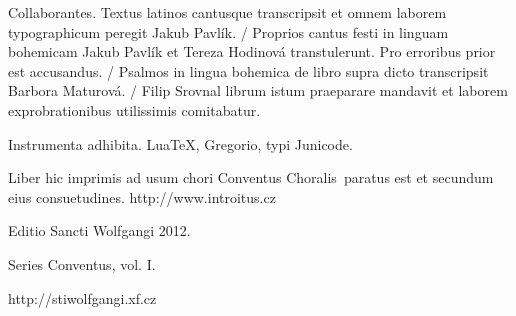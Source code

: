 \documentclass[a4paper, twoside, 12pt]{article}
\begin{document}
Collaborantes.
Textus latinos cantusque transcripsit et omnem laborem typographicum peregit
Jakub Pavlík. /
Proprios cantus festi in linguam bohemicam Jakub Pavlík et Tereza Hodinová
transtulerunt. Pro erroribus prior est accusandus. /
Psalmos in lingua bohemica de libro supra dicto transcripsit
Barbora Maturová. /
Filip Srovnal librum istum praeparare mandavit et laborem exprobrationibus
utilissimis comitabatur.

Instrumenta adhibita.
LuaTeX, %
Gregorio, %
typi Junicode. %

\begin{center}
Liber hic imprimis ad usum chori 
\guillemotright Conventus Choralis\guillemotleft\ 
paratus est
et secundum eius consuetudines.
http://www.introitus.cz

\vspace{1cm}

{\large Editio Sancti Wolfgangi 2012.}

\vspace{2mm}

Series \guillemotright Conventus\guillemotleft, vol. I.

\vspace{1cm}

http://stiwolfgangi.xf.cz

\end{center}

\vfill
\end{document}
